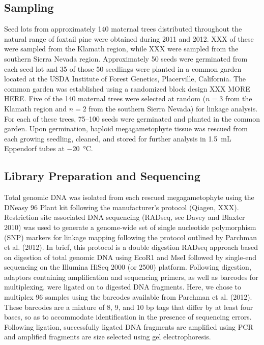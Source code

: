 \documentclass[11pt]{article}
\begin{document}
\subsection{Sampling}
Seed lots from approximately 140 maternal trees distributed throughout the natural range 
of foxtail pine were obtained during 2011 and 2012. XXX of these were sampled from the 
Klamath region, while XXX were sampled from the southern Sierra Nevada region. Approximately 
50 seeds were germinated from each seed lot and 35 of those 50 seedlings were planted in a 
common garden located at the USDA Institute of Forest Genetics, Placerville, California. The 
common garden was established using a randomized block design XXX MORE HERE. Five of the 
140 maternal trees were selected at random ($n = 3$ from the Klamath region and $n = 2$ from 
the southern Sierra Nevada) for linkage analysis. For each of these trees, \SIrange{75}{100}{} 
seeds were germinated and planted in the common garden. Upon germination, haploid 
megagametophyte tissue was rescued from each growing seedling, cleaned, and stored for further 
analysis in \SI{1.5}{\mL} Eppendorf tubes at \SI{-20}{\celsius}.


\subsection{Library Preparation and Sequencing}

Total genomic DNA was isolated from each rescued megagametophyte using the DNeasy 96 Plant 
kit following the manufacturer’s protocol (Qiagen, XXX). Restriction site associated DNA 
sequencing (RADseq, see Davey and Blaxter 2010) was used to generate a genome-wide set of 
single nucleotide polymorphism (SNP) markers for linkage mapping following the protocol 
outlined by Parchman et al. (2012). In brief, this protocol is a double digestion RADseq 
approach based on digestion of total genomic DNA using EcoR1 and MseI followed by single-end 
sequencing on the Illumina HiSeq 2000 (or 2500) platform. Following digestion, adaptors 
containing amplification and sequencing primers, as well as barcodes for multiplexing, 
were ligated on to digested DNA fragments. Here, we chose to multiplex 96 samples using the 
barcodes available from Parchman et al. (2012). These barcodes are a mixture of 8, 9, and 
10 bp tags that differ by at least four bases, so as to accommodate identification in the 
presence of sequencing errors. Following ligation, successfully ligated DNA fragments are 
amplified using PCR and amplified fragments are size selected using gel electrophoresis. 
\end{document}
